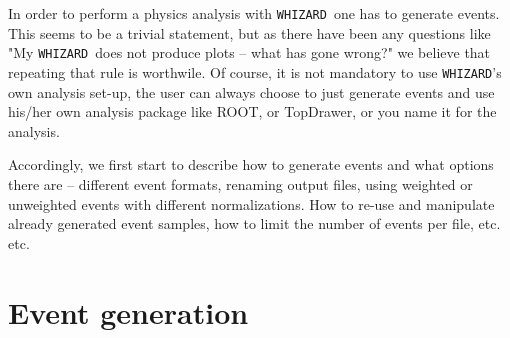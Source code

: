\documentclass[12pt]{book}
\newcommand{\whizard}{\texttt{WHIZARD}}
\begin{document}
In order to perform a physics analysis with \whizard\ one has to
generate events. This seems to be a trivial statement, but as there
have been any questions like "My \whizard\ does not produce plots --
what has gone wrong?" we believe that repeating that rule is
worthwile. Of course, it is not mandatory to use \whizard's own analysis
set-up, the user can always choose to just generate events and use
his/her own analysis package like ROOT, or TopDrawer, or you name it
for the analysis. 

Accordingly, we first start to describe how to generate events and
what options there are -- different event formats, renaming output
files, using weighted or unweighted events with different
normalizations. How to re-use and manipulate already generated event
samples, how to limit the number of events per file, etc. etc.

\section{Event generation}
\end{document}
